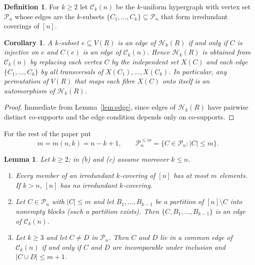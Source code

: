 \documentclass{amsart}
\newtheorem{lemma}[theorem]{Lemma}
\newtheorem{corollary}[theorem]{Corollary}
\theoremstyle{definition}
\newtheorem{definition}[theorem]{Definition}
\theoremstyle{remark}
\newcommand{\cC}{\mathcal{C}}
\newcommand{\cP}{\mathcal{P}}
\newcommand{\cH}{\mathcal{H}}
\newcommand{\nn}{[n]}
\begin{document}
\begin{definition}
For $k\ge 2$ let $\cC_k(n)$ be the $k$-uniform hypergraph with vertex set $\cP_n$ whose edges are the $k$-subsets $\{C_1,\dots,C_k\}\subseteq\cP_n$ that form irredundant coverings of $\nn$.
\end{definition}

\begin{corollary}\label{cor:blowup}
A $k$-subset $e\subseteq V(R)$ is an edge of $\cH_k(R)$ if and only if $C$ is injective on $e$ and $C(e)$ is an edge of $\cC_k(n)$. Hence $\cH_k(R)$ is obtained from $\cC_k(n)$ by replacing each vertex $C$ by the independent set $X(C)$ and each edge $\{C_1,\dots,C_k\}$ by all transversals of $X(C_1),\dots,X(C_k)$. In particular, any permutation of $V(R)$ that maps each fibre $X(C)$ onto itself is an automorphism of $\cH_k(R)$.
\end{corollary}

\begin{proof}
Immediate from Lemma~\ref{lem:edge}, since edges of $\cH_k(R)$ have pairwise distinct co-supports and the edge condition depends only on co-supports.
\end{proof}

For the rest of the paper put
\[
m=m(n,k)=n-k+1,\qquad \cP_n^{\le m}=\{C\in\cP_n: |C|\le m\}.
\]

\begin{lemma}\label{lem:comb}
Let $k\ge 2$; in (b) and (c) assume moreover $k\le n$.
\begin{enumerate}
\item[(a)] Every member of an irredundant $k$-covering of $\nn$ has at most $m$ elements. If $k>n$, $\nn$ has no irredundant $k$-covering.
\item[(b)] Let $C\in\cP_n$ with $|C|\le m$ and let $B_1,\dots,B_{k-1}$ be a partition of $\nn\setminus C$ into nonempty blocks (such a partition exists). Then $\{C,B_1,\dots,B_{k-1}\}$ is an edge of $\cC_k(n)$.
\item[(c)] Let $k\ge 3$ and let $C\ne D$ in $\cP_n$. Then $C$ and $D$ lie in a common edge of $\cC_k(n)$ if and only if $C$ and $D$ are incomparable under inclusion and $|C\cup D|\le m+1$.
\end{enumerate}
\end{lemma}
\end{document}
